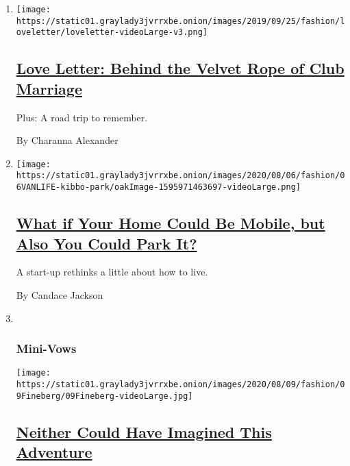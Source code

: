 \begin{enumerate}
\def\labelenumi{\arabic{enumi}.}
\item
  \texttt{[image: https://static01.graylady3jvrrxbe.onion/images/2019/09/25/fashion/loveletter/loveletter-videoLarge-v3.png]}

  \hypertarget{love-letter-behind-the-velvet-rope-of-club-marriage}{%
  \subsection{\texorpdfstring{\href{/2020/08/07/style/love-letter-newsletter-behind-the-velvet-rope-of-club-marriage.html}{Love
  Letter: Behind the Velvet Rope of Club
  Marriage}}{Love Letter: Behind the Velvet Rope of Club Marriage}}\label{love-letter-behind-the-velvet-rope-of-club-marriage}}

  Plus: A road trip to remember.

  By Charanna Alexander
\item
  \texttt{[image: https://static01.graylady3jvrrxbe.onion/images/2020/08/06/fashion/06VANLIFE-kibbo-park/oakImage-1595971463697-videoLarge.png]}

  \hypertarget{what-if-your-home-could-be-mobile-but-also-you-could-park-it}{%
  \subsection{\texorpdfstring{\href{/2020/08/07/style/kibbo-van-life-startup.html}{What
  if Your Home Could Be Mobile, but Also You Could Park
  It?}}{What if Your Home Could Be Mobile, but Also You Could Park It?}}\label{what-if-your-home-could-be-mobile-but-also-you-could-park-it}}

  A start-up rethinks a little about how to live.

  By Candace Jackson
\item ~
  \hypertarget{mini-vows}{%
  \subsubsection{Mini-Vows}\label{mini-vows}}

  \texttt{[image: https://static01.graylady3jvrrxbe.onion/images/2020/08/09/fashion/09Fineberg/09Fineberg-videoLarge.jpg]}

  \hypertarget{neither-could-have-imagined-this-adventure}{%
  \subsection{\texorpdfstring{\href{/2020/08/07/fashion/weddings/neither-could-have-imagined-this-adventure.html}{Neither
  Could Have Imagined This
  Adventure}}{Neither Could Have Imagined This Adventure}}\label{neither-could-have-imagined-this-adventure}}


\end{enumerate}
